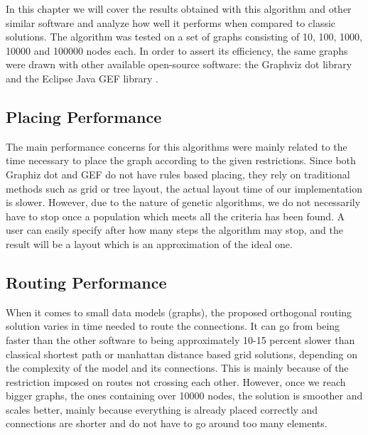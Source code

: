 \label{chap:results}

In this chapter we will cover the results obtained with this algorithm and
other similar software and analyze how well it performs when compared to
classic solutions. The algorithm was tested on a set of graphs consisting of 
10, 100, 1000, 10000 and 100000 nodes each. In order to assert its efficiency, 
the same graphs were drawn with other available open-source software: the Graphviz
dot library \cite{gansner2009drawing} and the Eclipse Java GEF library \cite{rubel2011eclipse}.

\subsection{Placing Performance}

The main performance concerns for this algorithms were mainly related to the 
time necessary to place the graph according to the given restrictions. Since 
both Graphiz dot and GEF do not have rules based placing, they rely on 
traditional methods such as grid or tree layout, the actual layout time of our 
implementation is slower. However, due to the nature of genetic algorithms, we 
do not necessarily have to stop once a population which meets all the criteria 
has been found. A user can easily specify after how many steps the algorithm may 
stop, and the result will be a layout which is an approximation of the ideal one.

\subsection{Routing Performance}

When it comes to small data models (graphs), the proposed orthogonal routing 
solution varies in time needed to route the connections. It can go from being 
faster than the other software to being approximately 10-15 percent slower than 
classical shortest path or manhattan distance based grid solutions, depending on 
the complexity of the model and its connections. This is mainly because of the 
restriction imposed on routes not crossing each other. However, once we reach 
bigger graphs, the ones containing over 10000 nodes, the solution is smoother and
scales better, mainly because everything is already placed correctly and connections 
are shorter and do not have to go around too many elements.
